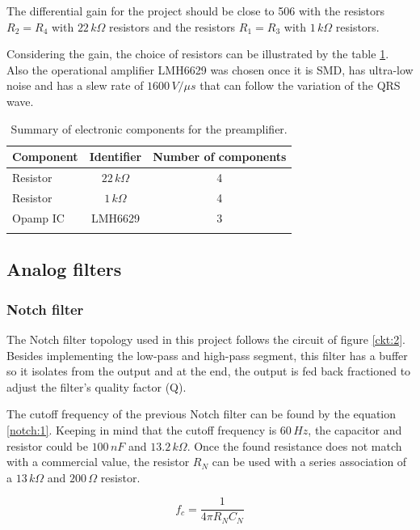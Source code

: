The differential gain for the project should be close to 506 with the resistors $R_2=R_4$ with $22 \, k\Omega$ resistors and the resistors $R_1=R_3$ with $1 \, k\Omega$ resistors. 

Considering the gain, the choice of resistors can be illustrated by the table \ref{tbl:2}. Also the operational amplifier LMH6629 \cite{instruments2010lmh6629} was chosen once it is SMD, has ultra-low noise and has a slew rate of $1600 \, V/\mu s$ that can follow the variation of the QRS wave.

\begin{longtable}[H]{lcc}

\toprule
Component & Identifier & Number of components \\
\midrule
\endhead
Resistor & $22 \, k\Omega$ & 4\\
Resistor & $1 \, k\Omega$ & 4\\
Opamp IC & LMH6629 & 3\\
\bottomrule
\caption{Summary of electronic components for the preamplifier.}
\label{tbl:2}
\end{longtable}

\subsection{Analog filters}

\subsubsection{Notch filter}

The Notch filter topology used in this project follows the circuit of figure \ref{ckt:2}. Besides implementing the low-pass and high-pass segment, this filter has a buffer so it isolates from the output and at the end, the output is fed back fractioned to adjust the filter's quality factor (Q).



The cutoff frequency of the previous Notch filter can be found by the equation \ref{notch:1}. Keeping in mind that the cutoff frequency is $60 \, Hz$, the capacitor and resistor could be $100 \, nF$ and $13.2 \, k\Omega$. Once the found resistance does not match with a commercial value, the resistor $R_N$ can be used with a series association of a $13 \, k\Omega$ and $200 \, \Omega$ resistor.

\begin{center}
\begin{equation} \label{notch:1}
    f_c = \frac{1}{4\pi R_N C_N}
\end{equation}
\end{center}

